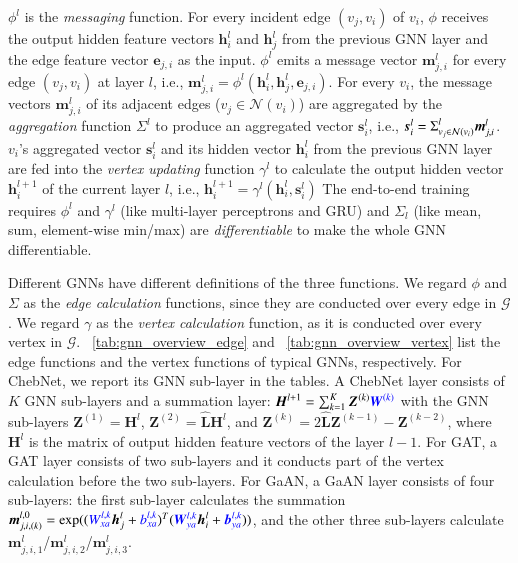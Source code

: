 $\phi^l$ is the \emph{messaging} function.
For every incident edge $(v_j, v_i)$ of $v_i$, $\phi$ receives the output hidden feature vectors $\boldsymbol{h}^l_i$ and $\boldsymbol{h}^l_j$ from the previous GNN layer and the edge feature vector $\boldsymbol{e}_{j,i}$ as the input.
$\phi^l$ emits a message vector $\boldsymbol{m}^l_{j,i}$ for every edge $(v_j, v_i)$ at layer $l$, i.e., $\boldsymbol{m}^l_{j,i}=\phi^l(\boldsymbol{h}^l_i, \boldsymbol{h}^l_j, \boldsymbol{e}_{j,i})$.
For every $v_i$, the message vectors $\boldsymbol{m}^l_{j,i}$ of its adjacent edges ($v_j \in \mathcal{N}(v_i)$) are aggregated by the \emph{aggregation} function $\Sigma^l$ to produce an aggregated vector $\boldsymbol{s}^l_i$, i.e., $\boldsymbol{s}^l_i=\mathlarger{\Sigma}^l_{v_j \in \mathcal{N}(v_i)}\boldsymbol{m}^l_{j,i}$.
$v_i$'s aggregated vector $\boldsymbol{s}^l_i$ and its hidden vector $\boldsymbol{h}^l_i$ from the previous GNN layer are fed into the \emph{vertex updating} function $\gamma^l$ to calculate the output hidden vector $\boldsymbol{h}^{l+1}_i$ of the current layer $l$, i.e., $\boldsymbol{h}^{l+1}_i = \gamma^l(\boldsymbol{h}^l_i, \boldsymbol{s}^l_i)$
The end-to-end training requires $\phi^l$ and $\gamma^l$ (like multi-layer perceptrons and GRU) and $\Sigma_l$ (like mean, sum, element-wise min/max) are \emph{differentiable} to make the whole GNN differentiable.

Different GNNs have different definitions of the three functions.
We regard $\phi$ and $\Sigma$ as the \emph{edge calculation} functions, since they are conducted over every edge in $\mathcal{G}$.
We regard $\gamma$ as the \emph{vertex calculation} function, as it is conducted over every vertex in $\mathcal{G}$.
\tablename~\ref{tab:gnn_overview_edge} and \tablename~\ref{tab:gnn_overview_vertex} list the edge functions and the vertex functions of typical GNNs, respectively.
For ChebNet, we report its GNN sub-layer in the tables.
A ChebNet layer consists of $K$ GNN sub-layers and a summation layer:
$\boldsymbol{H}^{l+1} = \sum_{k=1}^K{\boldsymbol{Z}^{(k)} \textcolor{blue}{\boldsymbol{W}^{(k)}}}$ with the GNN sub-layers $\boldsymbol{Z}^{(1)}=\boldsymbol{H}^l$, $\boldsymbol{Z}^{(2)}=\hat{\boldsymbol{L}}\boldsymbol{H}^l$, and $\boldsymbol{Z}^{(k)}=2\hat{\boldsymbol{L}}\boldsymbol{Z}^{(k-1)} - \boldsymbol{Z}^{(k-2)}$, where $\boldsymbol{H}^l$ is the matrix of output hidden feature vectors of the layer $l-1$.
For GAT, a GAT layer consists of two sub-layers and it conducts part of the vertex calculation before the two sub-layers.
For GaAN, a GaAN layer consists of four sub-layers: the first sub-layer calculates the summation $\boldsymbol{m}_{j, i, (k)}^{l,0}  = \exp((\textcolor{blue}{W^{l, k}_{xa}} \boldsymbol{h}_j^l + \textcolor{blue}{b^{l, k}_{xa}})^T (\textcolor{blue}{\boldsymbol{W}^{l, k}_{ya}} \boldsymbol{h}_i^l + \textcolor{blue}{\boldsymbol{b}^{l,k}_{ya}}))$, and the other three sub-layers calculate $\boldsymbol{m}^l_{j,i,1}$/$\boldsymbol{m}^l_{j,i,2}$/$\boldsymbol{m}^l_{j,i,3}$.

